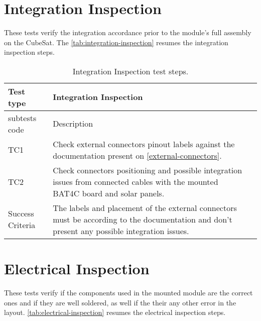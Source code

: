 \section{Integration Inspection}

These tests verify the integration accordance prior to the module's full assembly on the CubeSat. The \autoref{tab:integration-inspection} resumes the integration inspection steps. 

\begin{table}[!htb]
\centering
\caption{Integration Inspection test steps.}
\label{tab:integration-inspection}
\begin{tabular}{m{3cm} m{12cm} m{3cm}}
\toprule
Test type & Integration Inspection \\
\midrule
\midrule
subtests code & Description \\ 
\midrule
TC1 & Check external connectors pinout labels against the documentation present on \autoref{external-connectors}. \\
\midrule
TC2 & Check connectors positioning and possible integration issues from connected cables with the mounted BAT4C board and solar panels. \\
\midrule
\midrule
Success Criteria & The labels and placement of the external connectors must be according to the documentation and don't present any possible integration issues. \\
\bottomrule
\end{tabular}
\end{table}

\section {Electrical Inspection}

These tests verify if the components used in the mounted module are the correct ones and if they are well soldered, as well if the their any other error in the layout. \autoref{tab:electrical-inspection} resumes the electrical inspection steps.

